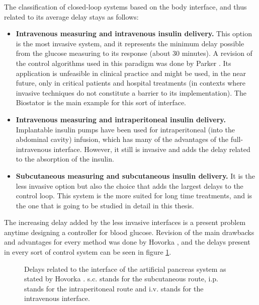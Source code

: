 The classification of closed-loop systems based on the body interface, and thus related to its average delay stays as follows:
\begin{itemize}
	\item \textbf{Intravenous measuring and intravenous insulin delivery.} This option is the most invasive system, and it represents the minimum delay possible from the glucose measuring to its response (about 30 minutes). A revision of the control algorithms used in this paradigm was done by Parker \cite{parker2001intravenous}. Its application is unfeasible in clinical practice and might be used, in the near future, only in critical patients and hospital treatments (in contexts where invasive techniques do not constitute a barrier to its implementation). The Biostator is the main example for this sort of interface.
	\item \textbf{Intravenous measuring and intraperitoneal insulin delivery.} Implantable insulin pumps have been used for intraperitoneal (into the abdominal cavity) infusion, which has many of the advantages of the full-intravenous interface. However, it still is invasive and adds the delay related to the absorption of the insulin.
	\item \textbf{Subcutaneous measuring and subcutaneous insulin delivery.} It is the less invasive option but also the choice that adds the largest delays to the control loop. This system is the more suited for long time treatments, and is the one that is going to be studied in detail in this thesis.
\end{itemize}
The increasing delay added by the less invasive interfaces is a present problem anytime designing a controller for blood glucose. Revision of the main drawbacks and advantages for every method was done by Hovorka \cite{hovorka2006continuous}, and the delays present in every sort of control system can be seen in figure \ref{fig:delays}.

\begin{figure}[hbtp]
\centering
{}\caption{Delays related to the interface of the artificial pancreas system as stated by Hovorka \cite{hovorka2006continuous}. s.c. stands for the subcutaneous route, i.p. stands for the intraperitoneal route and i.v. stands for the intravenous interface.}
\label{fig:delays}
\end{figure}

